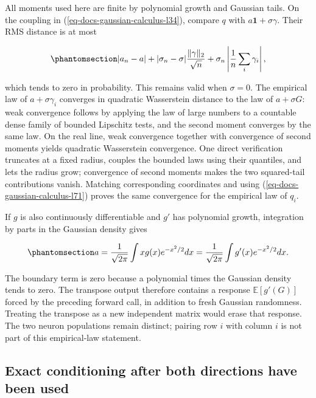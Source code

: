 \documentclass[
  11pt,
]{article}
\theoremstyle{definition}
\theoremstyle{plain}
\theoremstyle{plain}
\theoremstyle{plain}
\theoremstyle{remark}
\begin{document}
All moments used here are finite by polynomial growth and Gaussian
tails. On the coupling in (\ref{eq-docs-gaussian-calculus-l34}), compare
\(q\) with \(a\mathbf{1}+\sigma\gamma\). Their RMS distance is at most

\begin{equation}\protect\phantomsection\label{eq-docs-gaussian-calculus-l71}{
|a_n-a|+|\sigma_n-\sigma|\frac{\|\gamma\|_2}{\sqrt n}
+\sigma_n\left|\frac1n\sum_i\gamma_i\right|,
}\end{equation}

which tends to zero in probability. This remains valid when
\(\sigma=0\). The empirical law of \(a+\sigma\gamma_i\) converges in
quadratic Wasserstein distance to the law of \(a+\sigma G\): weak
convergence follows by applying the law of large numbers to a countable
dense family of bounded Lipschitz tests, and the second moment converges
by the same law. On the real line, weak convergence together with
convergence of second moments yields quadratic Wasserstein convergence.
One direct verification truncates at a fixed radius, couples the bounded
laws using their quantiles, and lets the radius grow; convergence of
second moments makes the two squared-tail contributions vanish. Matching
corresponding coordinates and using
(\ref{eq-docs-gaussian-calculus-l71}) proves the same convergence for
the empirical law of \(q_i\).

If \(g\) is also continuously differentiable and \(g'\) has polynomial
growth, integration by parts in the Gaussian density gives

\begin{equation}\protect\phantomsection\label{eq-docs-gaussian-calculus-l92}{
a=\frac1{\sqrt{2\pi}}\int xg(x)e^{-x^2/2}dx
=\frac1{\sqrt{2\pi}}\int g'(x)e^{-x^2/2}dx.
}\end{equation}

The boundary term is zero because a polynomial times the Gaussian
density tends to zero. The transpose output therefore contains a
response \(\mathbb{E}[g'(G)]\) forced by the preceding forward call, in
addition to fresh Gaussian randomness. Treating the transpose as a new
independent matrix would erase that response. The two neuron populations
remain distinct; pairing row \(i\) with column \(i\) is not part of this
empirical-law statement.

\subsection{Exact conditioning after both directions have been
used}\label{sec-docs-gaussian-calculus-l105}
\end{document}
